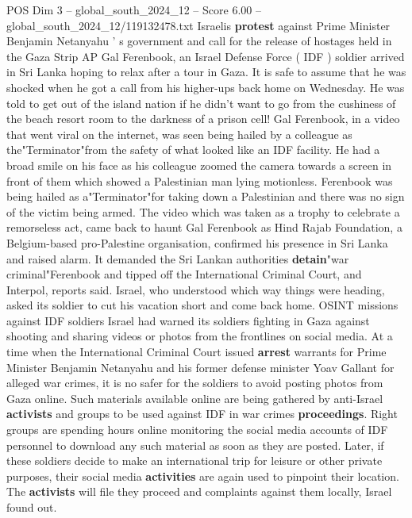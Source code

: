 \begin{textsample}{POS Dim 3 – global\_south\_2024\_12 – Score 6.00 – global\_south\_2024\_12/119132478.txt}  \label{ex:f3_pos_396}
Israelis \textbf{protest} against Prime Minister Benjamin Netanyahu ' s government and call for the release of hostages held in the Gaza Strip AP Gal Ferenbook, an Israel Defense Force ( IDF ) soldier arrived in Sri Lanka hoping to relax after a tour in Gaza.
It is safe to assume that he was shocked when he got a call from his higher-ups back home on Wednesday.
He was told to get out of the island nation if he didn't want to go from the cushiness of the beach resort room to the darkness of a prison cell!
Gal Ferenbook, in a video that went viral on the internet, was seen being hailed by a colleague as the"Terminator"from the safety of what looked like an IDF facility.
He had a broad smile on his face as his colleague zoomed the camera towards a screen in front of them which showed a Palestinian man lying motionless.
Ferenbook was being hailed as a"Terminator"for taking down a Palestinian and there was no sign of the victim being armed.
The video which was taken as a trophy to celebrate a remorseless act, came back to haunt Gal Ferenbook as Hind Rajab Foundation, a Belgium-based pro-Palestine organisation, confirmed his presence in Sri Lanka and raised alarm.
It demanded the Sri Lankan authorities \textbf{detain}"war criminal"Ferenbook and tipped off the International Criminal Court, and Interpol, reports said.
Israel, who understood which way things were heading, asked its soldier to cut his vacation short and come back home.
OSINT missions against IDF soldiers Israel had warned its soldiers fighting in Gaza against shooting and sharing videos or photos from the frontlines on social media.
At a time when the International Criminal Court issued \textbf{arrest} warrants for Prime Minister Benjamin Netanyahu and his former defense minister Yoav Gallant for alleged war crimes, it is no safer for the soldiers to avoid posting photos from Gaza online.
Such materials available online are being gathered by anti-Israel \textbf{activists} and groups to be used against IDF in war crimes \textbf{proceedings}.
Right groups are spending hours online monitoring the social media accounts of IDF personnel to download any such material as soon as they are posted.
Later, if these soldiers decide to make an international trip for leisure or other private purposes, their social media \textbf{activities} are again used to pinpoint their location.
The \textbf{activists} will file they proceed and complaints against them locally, Israel found out.

\end{textsample}
